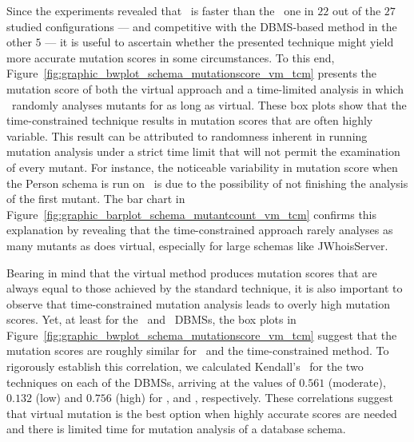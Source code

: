 


 Since the experiments revealed that \vma~is faster than the \Original~one in $22$ out of the $27$ studied configurations --- and competitive with the DBMS-based method in the other $5$ --- it is useful to ascertain whether the presented technique might yield more accurate mutation scores in some circumstances. To this end, Figure~\ref{fig:graphic_bwplot_schema_mutationscore_vm_tcm} presents the mutation score of both the virtual approach and a time-limited analysis in which \Original~randomly analyses mutants for as long as virtual. These box plots show that the time-constrained technique results in mutation scores that are often highly variable. This result can be attributed to randomness inherent in running mutation analysis under a strict time limit that will not permit the examination of every mutant.
%
For instance, the noticeable variability in \mbox{mutation} score when the Person schema is run on \Postgres~is due to the possibility of not finishing the analysis of the first mutant. The bar chart in Figure~\ref{fig:graphic_barplot_schema_mutantcount_vm_tcm} confirms this explanation by revealing that the time-constrained approach rarely analyses as many mutants as does virtual, especially for large schemas like JWhoisServer.

Bearing in mind that the virtual method produces mutation scores that are always equal to those achieved by the standard technique, it is also important to observe that time-constrained mutation analysis leads to overly high mutation scores.  Yet, at least for the \HyperSQL~and \SQLite~DBMSs, the box plots in Figure~\ref{fig:graphic_bwplot_schema_mutationscore_vm_tcm} suggest that the mutation scores are roughly similar for \vma~and the time-constrained method. To rigorously establish this correlation, we calculated Kendall's \taub~for the two techniques on each of the DBMSs, arriving at the values of $0.561$ (moderate), $0.132$ (low) and $0.756$ (high) for \HyperSQL, \PostgreSQL and \sqlite, respectively. These correlations suggest that virtual mutation is the best option when highly accurate scores are needed and there is limited time for mutation analysis of a database schema.

